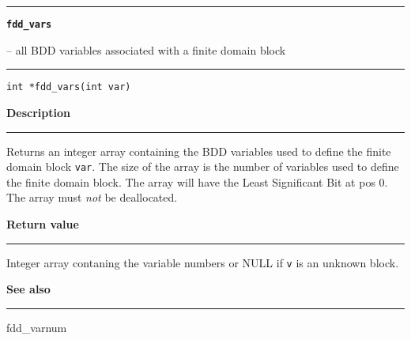 \begin{minipage}{\textwidth}

\noindent\begin{minipage}{\textwidth}
\rule{\textwidth}{0.5mm}
{\tt\bf fdd\_vars }
\--- all BDD variables associated with a finite domain block  \hspace{\fill}
\\\rule[1.5ex]{\textwidth}{0.5mm}
\end{minipage}

\noindent\begin{verbatim}
int *fdd_vars(int var) 
\end{verbatim}

\vspace{\parsep}\noindent
{\bf Description}\\\rule[1.5ex]{\textwidth}{0.2mm}\vspace{-1.5ex}\setlength{\parindent}{1em}
Returns an integer array containing the BDD variables used to
           define the finite domain block {\tt var}. The size of the array
	   is the number of variables used to define the finite domain block.
	   The array will have the Least Significant Bit at pos 0. The
	   array must {\em not} be deallocated. 

\setlength{\parindent}{0em}\vspace{\parsep}\vspace{\baselineskip}\noindent
{\bf Return value}\\\rule[1.5ex]{\textwidth}{0.2mm}\vspace{-1.5ex}
Integer array contaning the variable numbers or NULL if
           {\tt v} is an unknown block. 

\vspace{\parsep}\vspace{\baselineskip}\noindent
{\bf See also}\\\rule[1.5ex]{\textwidth}{0.2mm}\vspace{-1.5ex}
fdd\_varnum 
\end{minipage}
\vspace{8ex}
